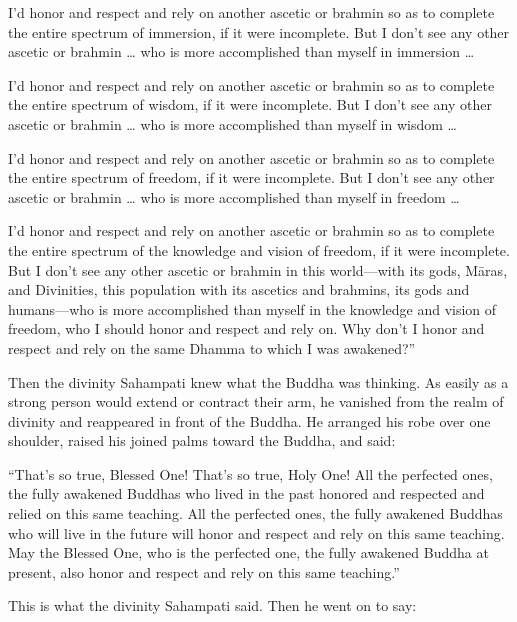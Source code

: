 \documentclass[12pt,openany]{book}%
\begin{document}
I’d honor and respect and rely on another ascetic or brahmin so as to complete the entire spectrum of immersion, if it were incomplete. But I don’t see any other ascetic or brahmin … who is more accomplished than myself in immersion … 

I’d honor and respect and rely on another ascetic or brahmin so as to complete the entire spectrum of wisdom, if it were incomplete. But I don’t see any other ascetic or brahmin … who is more accomplished than myself in wisdom … 

I’d honor and respect and rely on another ascetic or brahmin so as to complete the entire spectrum of freedom, if it were incomplete. But I don’t see any other ascetic or brahmin … who is more accomplished than myself in freedom … 

I’d honor and respect and rely on another ascetic or brahmin so as to complete the entire spectrum of the knowledge and vision of freedom, if it were incomplete. But I don’t see any other ascetic or brahmin in this world—with its gods, \textsanskrit{Māras}, and Divinities, this population with its ascetics and brahmins, its gods and humans—who is more accomplished than myself in the knowledge and vision of freedom, who I should honor and respect and rely on. Why don’t I honor and respect and rely on the same Dhamma to which I was awakened?” 

Then the divinity Sahampati knew what the Buddha was thinking. As easily as a strong person would extend or contract their arm, he vanished from the realm of divinity and reappeared in front of the Buddha. He arranged his robe over one shoulder, raised his joined palms toward the Buddha, and said: 

“That’s so true, Blessed One! That’s so true, Holy One! All the perfected ones, the fully awakened Buddhas who lived in the past honored and respected and relied on this same teaching. All the perfected ones, the fully awakened Buddhas who will live in the future will honor and respect and rely on this same teaching. May the Blessed One, who is the perfected one, the fully awakened Buddha at present, also honor and respect and rely on this same teaching.” 

This is what the divinity Sahampati said. Then he went on to say: 
\end{document}
